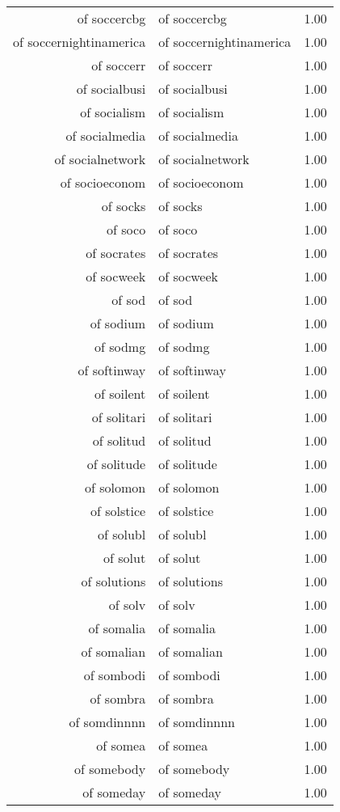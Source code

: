 \begin{table}[ht]
\begin{tabular}{rlr}
  of soccercbg & of soccercbg & 1.00 \\ 
  of soccernightinamerica & of soccernightinamerica & 1.00 \\ 
  of soccerr & of soccerr & 1.00 \\ 
  of socialbusi & of socialbusi & 1.00 \\ 
  of socialism & of socialism & 1.00 \\ 
  of socialmedia & of socialmedia & 1.00 \\ 
  of socialnetwork & of socialnetwork & 1.00 \\ 
  of socioeconom & of socioeconom & 1.00 \\ 
  of socks & of socks & 1.00 \\ 
  of soco & of soco & 1.00 \\ 
  of socrates & of socrates & 1.00 \\ 
  of socweek & of socweek & 1.00 \\ 
  of sod & of sod & 1.00 \\ 
  of sodium & of sodium & 1.00 \\ 
  of sodmg & of sodmg & 1.00 \\ 
  of softinway & of softinway & 1.00 \\ 
  of soilent & of soilent & 1.00 \\ 
  of solitari & of solitari & 1.00 \\ 
  of solitud & of solitud & 1.00 \\ 
  of solitude & of solitude & 1.00 \\ 
  of solomon & of solomon & 1.00 \\ 
  of solstice & of solstice & 1.00 \\ 
  of solubl & of solubl & 1.00 \\ 
  of solut & of solut & 1.00 \\ 
  of solutions & of solutions & 1.00 \\ 
  of solv & of solv & 1.00 \\ 
  of somalia & of somalia & 1.00 \\ 
  of somalian & of somalian & 1.00 \\ 
  of sombodi & of sombodi & 1.00 \\ 
  of sombra & of sombra & 1.00 \\ 
  of somdinnnn & of somdinnnn & 1.00 \\ 
  of somea & of somea & 1.00 \\ 
  of somebody & of somebody & 1.00 \\ 
  of someday & of someday & 1.00 \\ 

\end{tabular}
\end{table}
